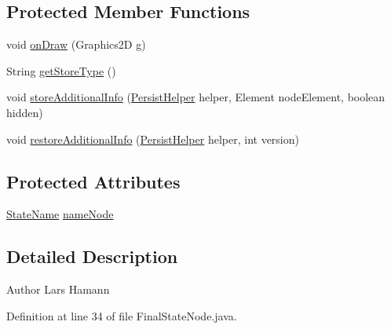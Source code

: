 \subsection*{Protected Member Functions}
\begin{DoxyCompactItemize}
\item 
void \hyperlink{classorg_1_1tzi_1_1use_1_1gui_1_1views_1_1diagrams_1_1statemachine_1_1_final_state_node_a2676257bc55699029be2f98ea612b3eb}{on\-Draw} (Graphics2\-D g)
\item 
String \hyperlink{classorg_1_1tzi_1_1use_1_1gui_1_1views_1_1diagrams_1_1statemachine_1_1_final_state_node_a76b4a37fc8c4430ac8233cc96d6a92d2}{get\-Store\-Type} ()
\item 
void \hyperlink{classorg_1_1tzi_1_1use_1_1gui_1_1views_1_1diagrams_1_1statemachine_1_1_final_state_node_ac7fbccfd3fe213db6bc513819ac25c5d}{store\-Additional\-Info} (\hyperlink{classorg_1_1tzi_1_1use_1_1gui_1_1util_1_1_persist_helper}{Persist\-Helper} helper, Element node\-Element, boolean hidden)
\item 
void \hyperlink{classorg_1_1tzi_1_1use_1_1gui_1_1views_1_1diagrams_1_1statemachine_1_1_final_state_node_adb5cd95cb2286abf47faf735ec5c056e}{restore\-Additional\-Info} (\hyperlink{classorg_1_1tzi_1_1use_1_1gui_1_1util_1_1_persist_helper}{Persist\-Helper} helper, int version)
\end{DoxyCompactItemize}
\subsection*{Protected Attributes}
\begin{DoxyCompactItemize}
\item 
\hyperlink{classorg_1_1tzi_1_1use_1_1gui_1_1views_1_1diagrams_1_1statemachine_1_1_state_name}{State\-Name} \hyperlink{classorg_1_1tzi_1_1use_1_1gui_1_1views_1_1diagrams_1_1statemachine_1_1_final_state_node_a55c71df0d819f877b6ef631794c05868}{name\-Node}
\end{DoxyCompactItemize}


\subsection{Detailed Description}
\begin{DoxyAuthor}{Author}
Lars Hamann 
\end{DoxyAuthor}


Definition at line 34 of file Final\-State\-Node.\-java.



